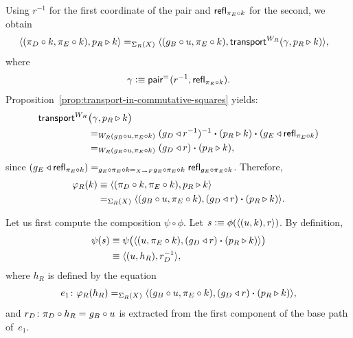 \begin{solution}
    Using $r^{-1}$ for the first coordinate of the pair and $\mathsf{refl}_{\pi_E\circ k}$ for the second, we obtain
    \begin{align*}
        \langle
            (\pi_D\circ k,\pi_E\circ k),
            p_R\triangleright k
        \rangle
        &\mathrel{=_{\Sigma_R(X)}}
        \langle
            (g_B\circ u,\pi_E\circ k),
            \mathsf{transport}^{W_R}(\gamma,p_R\triangleright k)
        \rangle,
    \end{align*}
    where
    \[
        \gamma\mathrel{\vcentcolon}\equiv\mathsf{pair}^{\mathrel{=_{}}}(r^{-1},\mathsf{refl}_{\pi_E\circ k}).
    \]
    Proposition~\ref{prop:transport-in-commutative-squares} yields:
    \begin{align*}
        \mathsf{transport}^{W_R}&\bigl(\gamma, p_R\triangleright k\bigr)\\
            &\mathrel{=_{W_R(g_B\circ u,\pi_E\circ k)}}
                (g_D\triangleleft r^{-1})^{-1}
                \mathbin{\boldsymbol{\cdot}}(p_R\triangleright k)
                \mathbin{\boldsymbol{\cdot}}(g_E\triangleleft\mathsf{refl}_{\pi_E\circ k})\\
            &\mathrel{=_{W_R(g_B\circ u,\pi_E\circ k)}}
                (g_D\triangleleft r)
                \mathbin{\boldsymbol{\cdot}}(p_R\triangleright k),
    \end{align*}
    since $(g_E\triangleleft\mathsf{refl}_{\pi_E\circ k})\mathrel{=_{g_E\circ\pi_E\circ k\mathrel{=_{X\to F}}g_E\circ\pi_E\circ k}}\mathsf{refl}_{g_E\circ\pi_E\circ k}$. Therefore,
    \begin{align*}
        \varphi_R(k)
            &\equiv
                \langle
                    (\pi_D\circ k,\pi_E\circ k),
                    p_R\triangleright k
                \rangle\\
            &\mathrel{=_{\Sigma_R(X)}}
                \langle
                    (g_B\circ u,\pi_E\circ k),
                    (g_D\triangleleft r)\mathbin{\boldsymbol{\cdot}}(p_R\triangleright k)
                \rangle.
    \end{align*}
    
    Let us first compute the composition $\psi\circ\phi$. Let $s\mathrel{\vcentcolon}\equiv\phi(\langle(u,k),r\rangle)$. By definition,
    \begin{align*}
        \psi(s)&\equiv\psi
            \bigl(\langle
                (u,\pi_E\circ k),
                (g_D\triangleleft r)\mathbin{\boldsymbol{\cdot}}(p_R\triangleright k)
            \rangle\bigr)\\
        &\equiv\langle(u,h_R),r_D^{-1}\rangle,
    \end{align*}
    where $h_R$ is defined by the equation
    \[
        e_1\colon\varphi_R(h_R)
        \eq{\Sigma_R(X)}
        \dep{
            (g_B\circ u,\pi_E\circ k),
            (g_D\lwct r)\ct(p_R\rwct k)
        },
    \]
    and $r_D\colon\pi_D\circ h_R\eq{}g_B\circ u$ is extracted from the first component of the base path of~$e_1$.


\end{solution}
